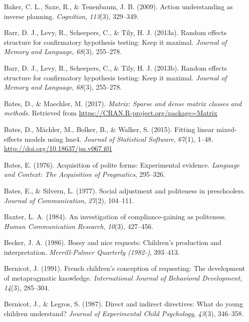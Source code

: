 \documentclass[oneside]{report}
\begin{document}
\hypertarget{ref-baker2009action}{}
Baker, C. L., Saxe, R., \& Tenenbaum, J. B. (2009). Action understanding
as inverse planning. \emph{Cognition}, \emph{113}(3), 329--349.

\hypertarget{ref-barr2013}{}
Barr, D. J., Levy, R., Scheepers, C., \& Tily, H. J. (2013a). Random
effects structure for confirmatory hypothesis testing: Keep it maximal.
\emph{Journal of Memory and Language}, \emph{68}(3), 255--278.

\hypertarget{ref-barr2013random}{}
Barr, D. J., Levy, R., Scheepers, C., \& Tily, H. J. (2013b). Random
effects structure for confirmatory hypothesis testing: Keep it maximal.
\emph{Journal of Memory and Language}, \emph{68}(3), 255--278.

\hypertarget{ref-R-Matrix}{}
Bates, D., \& Maechler, M. (2017). \emph{Matrix: Sparse and dense matrix
classes and methods}. Retrieved from
\url{https://CRAN.R-project.org/package=Matrix}

\hypertarget{ref-R-lme4}{}
Bates, D., Mächler, M., Bolker, B., \& Walker, S. (2015). Fitting linear
mixed-effects models using lme4. \emph{Journal of Statistical Software},
\emph{67}(1), 1--48. \url{http://doi.org/10.18637/jss.v067.i01}

\hypertarget{ref-bates1976}{}
Bates, E. (1976). Acquisition of polite forms: Experimental evidence.
\emph{Language and Context: The Acquisition of Pragmatics}, 295--326.

\hypertarget{ref-bates1977}{}
Bates, E., \& Silvern, L. (1977). Social adjustment and politeness in
preschoolers. \emph{Journal of Communication}, \emph{27}(2), 104--111.

\hypertarget{ref-baxter1984}{}
Baxter, L. A. (1984). An investigation of compliance-gaining as
politeness. \emph{Human Communication Research}, \emph{10}(3), 427--456.

\hypertarget{ref-becker1986}{}
Becker, J. A. (1986). Bossy and nice requests: Children's production and
interpretation. \emph{Merrill-Palmer Quarterly (1982-)}, 393--413.

\hypertarget{ref-bernicot1991}{}
Bernicot, J. (1991). French children's conception of requesting: The
development of metapragmatic knowledge. \emph{International Journal of
Behavioral Development}, \emph{14}(3), 285--304.

\hypertarget{ref-bernicot1987}{}
Bernicot, J., \& Legros, S. (1987). Direct and indirect directives: What
do young children understand? \emph{Journal of Experimental Child
Psychology}, \emph{43}(3), 346--358.
\end{document}
